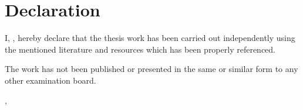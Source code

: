 \thispagestyle{empty}
\vspace*{0.8\textheight}
\chapter*{Declaration}
I, \getAuthor, hereby declare that the thesis work has been carried out independently using the mentioned literature and resources which has been properly referenced.
\vspace*{0.01\textheight}

\noindent
The work has not been published or presented in the same or similar form to any other examination board. 

\vspace{15mm}
\noindent
\getSubmissionLocation{}, \getSubmissionDate{} \hspace{50mm} \getAuthor{}

\cleardoublepage{}
